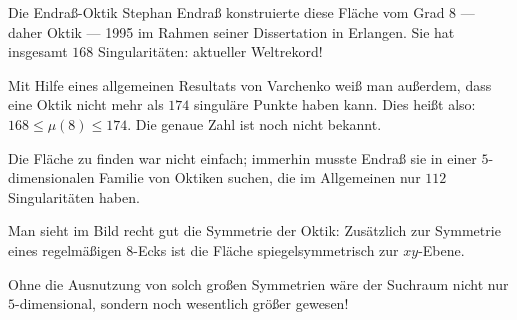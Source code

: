 \begin{surferPage}{Die Endraß-Oktik}
  Stephan Endraß konstruierte diese Fläche vom Grad $8$ --- daher Oktik --- 1995
    im Rahmen seiner Dissertation in Erlangen. 
    Sie hat insgesamt $168$ Singularitäten: aktueller Weltrekord! 

    Mit Hilfe eines allgemeinen Resultats von Varchenko weiß man außerdem,
    dass eine Oktik nicht mehr als $174$ singuläre Punkte haben kann.
    Dies heißt also: $168 \le \mu(8) \le 174$. 
    Die genaue Zahl ist noch nicht bekannt.

    Die Fläche zu finden war nicht einfach; immerhin musste Endraß sie in einer
    $5$-dimensionalen Familie von Oktiken suchen, die im Allgemeinen nur $112$
    Singularitäten haben.

    Man sieht im Bild recht gut die Symmetrie der Oktik:
    Zusätzlich zur Symmetrie eines regelmäßigen $8$-Ecks ist die Fläche
    spiegelsymmetrisch zur $xy$-Ebene. 

    Ohne die Ausnutzung von solch großen Symmetrien wäre der Suchraum nicht
    nur $5$-dimensional, sondern noch wesentlich größer gewesen!
\end{surferPage}
